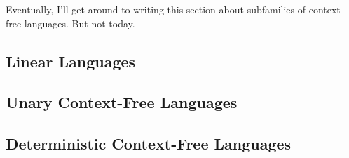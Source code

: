 \label{sec:subfamilies}

\begin{construction}
Eventually, I'll get around to writing this section about subfamilies of context-free languages. But not today.
\end{construction}

\subsection{Linear Languages}

\subsection{Unary Context-Free Languages}

\subsection{Deterministic Context-Free Languages}